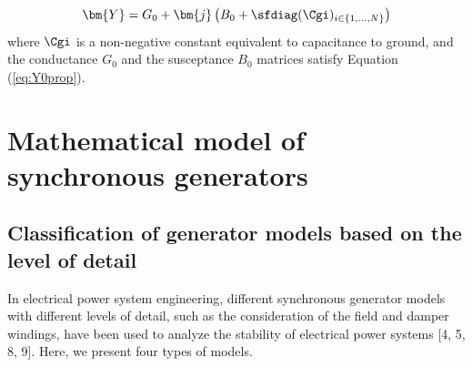 \documentclass[graybox, envcountchap]{svmult}
\begin{document}
\begin{equation}\label{eq:Ypig}
  \bm{Y} = G_0 + \bm{j} \left( B_0 + \sfdiag( \Cgi )_{i \in \{1,\ldots,N\}} \right)
\end{equation}
where $ \Cgi $ is a non-negative constant equivalent to capacitance to ground,
and the conductance $G_0$ and the susceptance $B_0$ matrices satisfy Equation
(\ref{eq:Y0prop}).

\section{Mathematical model of synchronous generators}\label{sec:genmod}

\subsection{Classification of generator models based on the level of detail}

In electrical power system engineering, different synchronous generator models
with different levels of detail, such as the consideration of the field and
damper windings, have been used to analyze the stability of electrical power
systems [4, 5, 8, 9]. Here, we present four types of models.
\end{document}
